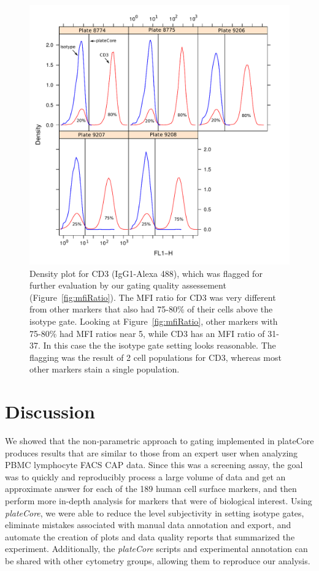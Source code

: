 \documentclass[12pt]{article}
\newcommand{\Rpackage}[1]{{\textit{#1}}}
\begin{document}
\begin{figure}
\centering
\includegraphics{mfiRatio2.pdf}
\caption{Density plot for CD3 (IgG1-Alexa 488), which was flagged for further
evaluation by our gating quality assessement (Figure~\ref{fig:mfiRatio}).
The MFI ratio for CD3 was very different from other markers that also had
75-80\% of their cells above the isotype gate. Looking at
Figure~\ref{fig:mfiRatio}, other markers with 75-80\% had MFI ratios near 5,
while CD3 has an MFI ratio of 31-37. In this case the the isotype
gate setting looks reasonable. The flagging was the result of 2 cell
populations for CD3, whereas most other markers stain a single population.
}
\label{fig:mfiRatio3}
\end{figure}

\clearpage
\section*{Discussion}

We showed that the non-parametric approach to gating implemented in plateCore
produces results that are similar to those from an expert user when analyzing
PBMC lymphocyte FACS CAP data. Since this was a screening assay, the goal was to
quickly and reproducibly process a large volume of data and get an approximate
answer for each of the 189 human cell surface markers, and then perform more
in-depth analysis for markers that were of biological interest. Using
\Rpackage{plateCore}, we were able to reduce the level subjectivity in setting
isotype gates, eliminate mistakes associated with manual data annotation and
export, and automate the creation of plots and data quality reports that
summarized the experiment. Additionally, the \Rpackage{plateCore} scripts and
experimental annotation can be shared with other cytometry groups, allowing
them to reproduce our analysis.
\end{document}
